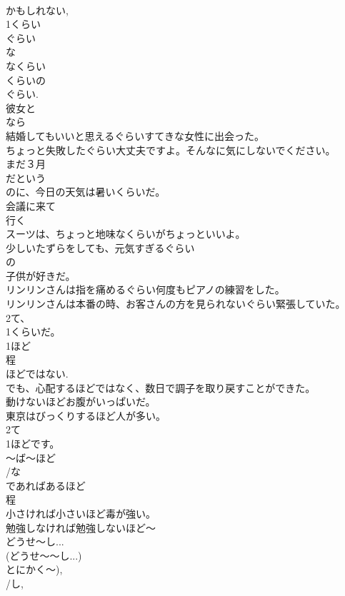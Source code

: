 \documentclass[8pt]{extreport}
\begin{document}
\begin{CJK}{UTF8}{min}
\\	かもしれない, 
\\	1くらい
\\	ぐらい
\\	な
\\	なくらい
\\	くらいの
\\	ぐらい. 
\\	彼女と
\\	なら
\\	結婚してもいいと思えるぐらいすてきな女性に出会った。
\\	ちょっと失敗したぐらい大丈夫ですよ。そんなに気にしないでください。
\\	まだ３月
\\	だという
\\	のに、今日の天気は暑いくらいだ。
\\	会議に来て
\\	行く
\\	スーツは、ちょっと地味なくらいがちょっといいよ。
\\	少しいたずらをしても、元気すぎるぐらい
\\	の
\\	子供が好きだ。
\\	リンリンさんは指を痛めるぐらい何度もピアノの練習をした。
\\	リンリンさんは本番の時、お客さんの方を見られないぐらい緊張していた。
\\	2て、
\\	1くらいだ。
\\	1ほど
\\	程 
\\	ほどではない. 
\\	でも、心配するほどではなく、数日で調子を取り戻すことができた。
\\	動けないほどお腹がいっぱいだ。 
\\	東京はびっくりするほど人が多い。
\\	2て
\\	1ほどです。
\\	～ば～ほど
\\	/な
\\	であればあるほど
\\	程　
\\	小さければ小さいほど毒が強い。　
\\	勉強しなければ勉強しないほど～
\\	どうせ～し...
\\	(どうせ～～し...)
\\	とにかく～), 
\\	/し, 

\end{CJK}
\end{document}
